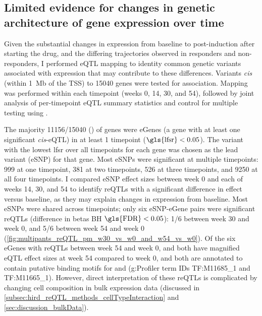     
\subsection{Limited evidence for changes in genetic architecture of gene expression over time}

Given the substantial changes in expression from baseline to post-induction after starting the drug, and the differing trajectories observed in responders and non-responders, 
I performed \gls{eQTL} mapping to identity common genetic variants associated with expression that may contribute to these differences.
Variants \textit{cis} (within \SI{1}{\mega b} of the \gls{TSS}) to \num{15040} genes were tested for association.
Mapping was performed within each timepoint (weeks 0, 14, 30, and 54),
followed by joint analysis of per-timepoint \gls{eQTL} summary statistics and control for multiple testing using  \autocite{urbut2018FlexibleStatisticalMethods}.



The majority \num{11156/15040} () of genes were eGenes (a gene with at least one significant \textit{cis}-\gls{eQTL}) in at least 1 timepoint ($\text{\gls{lfsr}} < 0.05$).
The variant with the lowest \gls{lfsr} over all timepoints for each gene was 
chosen as the lead variant (eSNP) for that gene.
Most eSNPs were significant at multiple timepoints: 
\num{999} at one timepoint, \num{381} at two timepoints, \num{526} at three timepoints, and \num{9250} at all four timepoints.
I compared eSNP effect sizes between week 0 and each of weeks 14, 30, and 54 to identify \glspl{reQTL} with a significant difference in effect versus baseline,
as they may explain changes in expression from baseline.
Most eSNPs were shared across timepoints;
only six eSNP-eGene pairs were significant \glspl{reQTL} (difference in betas \gls{BH} $\text{\gls{FDR}} < 0.05$):
1/6 between week 30 and week 0, and 5/6 between week 54 and week 0 (\cref{fig:multipants_reQTL_pm_w30_vs_w0_and_w54_vs_w0}).
Of the six eGenes with \glspl{reQTL} between week 54 and week 0,  and  both have magnified \gls{eQTL} effect sizes at week 54 compared to week 0,
and both are annotated to contain putative binding motifs for  and  ({g:Profiler} term IDs TF:M11685\_1 and TF:M11665\_1).
However, direct interpretation of these \glspl{reQTL} is complicated by changing cell composition in bulk expression data (discussed in \cref{subsec:hird_reQTL_methods_cellTypeInteraction} and \cref{sec:discussion_bulkData}).


